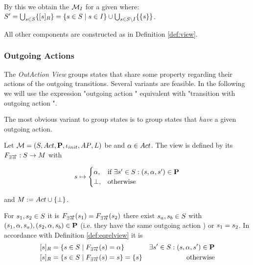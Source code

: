 \documentclass[preview]{standalone}
\begin{document}
By this we obtain the \viewN ${{{{{\mathcal{M}}}}_{{I}}}}$ for a given \achgphN \chgph where: ${S}' = \bigcup_{{s} \in {S}} \{{{[{s}]_{{R}}}}\} = \{{s} \in {S} \mid {s} \in {I}\}\cup \bigcup_{{s} \in {S} \setminus {I}}\{\{{s}\}\}$.

All other components are constructed as in Definition \ref{def:view}.

\subsubsection{Outgoing Actions}
The \emph{OutAction View} groups states that share some property regarding their actions  of the outgoing transitions. Several variants are feasible. In the following we will use the expression "outgoing action \action" equivalent with "transition with outgoing action \action".

The most obvious variant to group states is to group states that \emph{have} a given outgoing action. 

\begin{definition}
	Let ${{{\mathcal{M}}}} = {{({S}, {Act}, {\textbf{P}}, {\iota_{init}}, {AP}, {L})}}$ be \achgphN and ${\alpha} \in {Act}$. The view \viewhasoutaction is defined by its \grpfctN ${{F_{\exists{\overrightarrow{\ensuremath{{\alpha}}}}}}} : {S} \to {\ensuremath{{M}}}$ with 
	
	\[
	{s} \mapsto
	\begin{cases}
		{\alpha},				& \text{if } \exists {s}' \in {S}: ({s}, {\alpha}, {s}') \in {\ensuremath{{\textbf{P}}}} \\
		{\bot},          	& \text{otherwise}
	\end{cases}
	\]
	
	and ${{M}} := {{Act} \cup {\{\bot\}}}$.	
\end{definition}


For ${s}_1,{s}_2 \in {S}$ it is ${{F_{\exists{\overrightarrow{\ensuremath{{\alpha}}}}}}}({s}_1) = {{F_{\exists{\overrightarrow{\ensuremath{{\alpha}}}}}}}({s}_2)$ \iffN 
there exist ${s}_{a},{s}_{b} \in {S}$ with 
$({s}_1, {\alpha}, {s}_{a}), ({s}_2, {\alpha}, {s}_{b}) \in {\ensuremath{{\textbf{P}}}}$ (i.e. they have the same outgoing action \action) or ${s}_1 = {s}_2$. 
In accordance with Definition \ref{def:eqrelview} it is
\begin{align*}
	{\ensuremath{{[{s}]_{{R}}}}} &= \{{s} \in {S} \mid {\ensuremath{{F_{\exists{\overrightarrow{\ensuremath{{\alpha}}}}}}}}({s}) = {\alpha}\} &\exists{s}' \in {S} : ({s}, {\alpha}, {s}') \in {\ensuremath{{\textbf{P}}}} \\
	{{[{s}]_{{R}}}} &= \{{s} \in {S} \mid {\ensuremath{{F_{\exists{\overrightarrow{\ensuremath{{\alpha}}}}}}}}({s}) = {s}\} = \{s\} &\text{ otherwise}
\end{align*}
\end{document}
